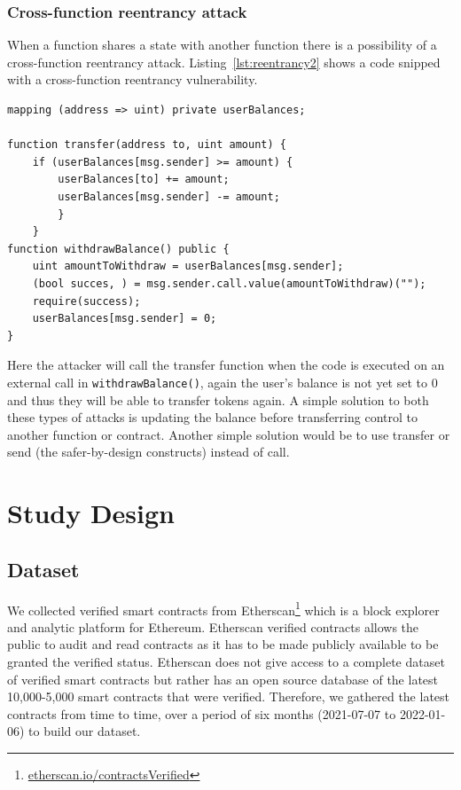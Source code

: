 \documentclass[10pt,conference]{IEEEtran}
\begin{document}
\subsubsection{Cross-function reentrancy attack}
When a function shares a state with another function there is a possibility of a cross-function reentrancy attack.  Listing~\ref{lst:reentrancy2}  shows a code snipped with a cross-function reentrancy vulnerability. 
\begin{lstlisting}[language=Solidity, caption=Cross-function reentrancy attack, label=lst:reentrancy2]
mapping (address => uint) private userBalances;

function transfer(address to, uint amount) {
    if (userBalances[msg.sender] >= amount) {
        userBalances[to] += amount;
        userBalances[msg.sender] -= amount;
        }
    }
function withdrawBalance() public {
    uint amountToWithdraw = userBalances[msg.sender];
    (bool succes, ) = msg.sender.call.value(amountToWithdraw)("");
    require(success);
    userBalances[msg.sender] = 0;
}

\end{lstlisting}
Here the attacker will call the transfer function when the code is executed on an external call in \texttt{withdrawBalance()},  again the user's balance is not yet set to 0 and thus they will be able to transfer tokens again. A simple solution to both these types of attacks is updating the balance before transferring control to another function or contract.  Another simple solution would be to use transfer or send (the safer-by-design constructs) instead of call.



\section{Study Design}
\subsection{Dataset}

We collected verified smart contracts from Etherscan\footnote{\url{etherscan.io/contractsVerified}} which is a block explorer and analytic platform for Ethereum. Etherscan verified contracts allows the public to audit and read contracts as it has to be made publicly available to be granted the verified status. Etherscan does not give access to a complete dataset of verified smart contracts but rather has an open source database of the latest 10,000-5,000 smart contracts that were verified. Therefore, we gathered the latest contracts from time to time, over a period of six months (2021-07-07 to 2022-01-06) to build our dataset.
\end{document}
